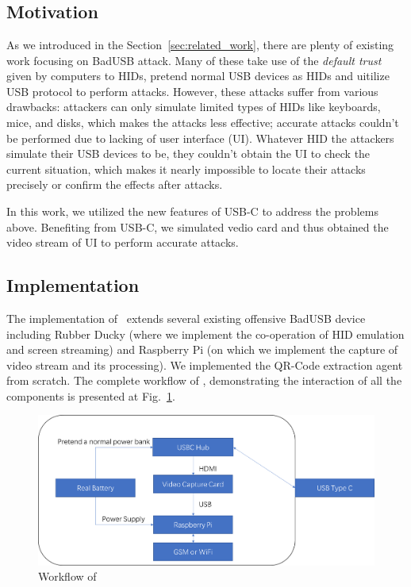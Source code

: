 \section{\tool}

\subsection{Motivation}
As we introduced in the Section~\ref{sec:related_work}, there are plenty of existing work  focusing on BadUSB attack. 
Many of these take use of the \textit{default trust} given by computers to HIDs, pretend normal USB devices as HIDs and uitilize USB protocol to perform attacks. 
However, these attacks suffer from various drawbacks:
 attackers can only simulate limited types of HIDs like keyboards, mice, and disks, which makes the attacks less effective;
 accurate attacks couldn't be performed due to lacking of user interface (UI).
Whatever HID the attackers simulate their USB devices to be, they couldn't obtain the UI to check the current situation, which makes it nearly impossible to locate their attacks precisely or confirm the effects after attacks.

In this work, we utilized the new features of USB-C to address the problems above.
Benefiting from USB-C, we simulated vedio card and thus obtained the video stream of UI to perform accurate attacks.

\subsection{Implementation}
The implementation of \tool\ extends several existing offensive BadUSB device including Rubber Ducky (where we implement the co-operation of HID emulation and screen streaming) and Raspberry Pi (on which we implement the capture of video stream and its processing). We implemented the QR-Code extraction agent from scratch. The complete workflow of \tool, demonstrating the interaction of all the components is presented at Fig.~\ref{fig:workflow}.

\begin{figure}[htbp]
\includegraphics[width=\linewidth]{./Figs/workflow.png}
\caption{Workflow of \tool}
\label{fig:workflow}
\end{figure}


